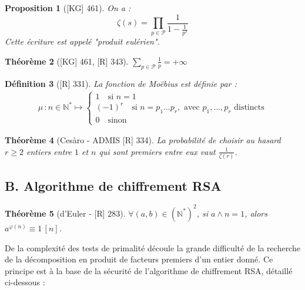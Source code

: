 \documentclass[10pt, a4paper, parskip=full, twoside, twocolumn]{report}
\newtheorem{definition}{Définition}
\newtheorem{theorem}[definition]{Théorème}
\newtheorem{proposition}[definition]{Proposition}
\newcommand{\IN}{\mathbb{N}}
\begin{document}
\begin{proposition}[\textnormal{[KG] 461}]
	On a :
	$$\zeta(s) = \prod_{p\in\mathcal{P}}\frac{1}{1 - \frac{1}{p^s}}$$
	Cette écriture est appelé \emph{"produit eulérien"}.
\end{proposition}

\begin{theorem}[\textnormal{[KG] 461, [R] 343}]
	$\sum_{p\in\mathcal{P}}\frac{1}{p} = +\infty$
\end{theorem}

\begin{definition}[\textnormal{[R] 331}]
	La \emph{fonction de Moëbius} est définie par :
	\begin{align*}
		\mu\,\colon n\in\IN^* \mapsto \begin{cases}
			1\quad \text{si } n =1 \\
			(-1)^r\quad \text{si } n=p_1\dots p_r,\text{ avec $p_1,\dots,p_r$ distincts} \\
			0\quad\text{sinon}
		\end{cases}
	\end{align*}
\end{definition}

\begin{theorem}[Cesàro - ADMIS \textnormal{[R] 334}]
	La probabilité de choisir au hasard $r\geq 2$ entiers entre $1$ et $n$ qui sont premiers entre eux vaut $\frac{1}{\zeta(r)}$.
\end{theorem}

\subsection*{B. Algorithme de chiffrement RSA}

\begin{theorem}[d'Euler - \textnormal{[R] 283}]
	$\forall (a,b)\in\left(\IN^*\right)^2$, si $a\wedge n = 1$, alors $a^{\varphi(n)} \equiv 1\,[n]$.
\end{theorem}

De la complexité des tests de primalité découle la grande difficulté de la recherche de la décomposition en produit de facteurs premiers d'un entier donné.
Ce principe est à la base de la sécurité de l'algorithme de chiffrement RSA, détaillé ci-dessous :
\end{document}
